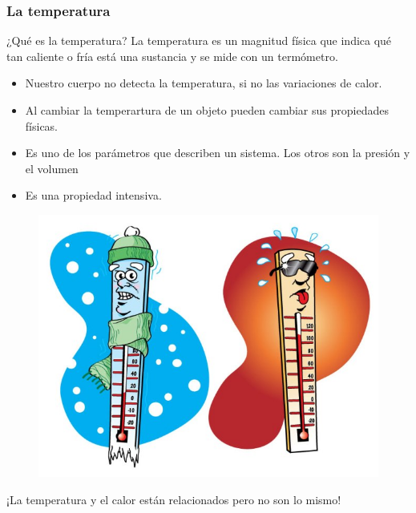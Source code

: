\documentclass[handout]{beamer}
\begin{document}
\begin{frame}
  \frametitle{La temperatura}
  \begin{block}{¿Qué es la temperatura?}
    La temperatura es un magnitud física que indica qué tan caliente o fría está una
    sustancia y se mide con un termómetro.
  \end{block}

  \begin{itemize}
  \item Nuestro cuerpo no detecta la temperatura, si no las variaciones de calor.
  \item Al cambiar la temperartura de un objeto pueden cambiar sus propiedades físicas.
  \item Es uno de los parámetros que describen un sistema. Los otros son la presión y el
    volumen
  \item Es una propiedad intensiva. 
  \end{itemize}
\end{frame}

\begin{frame}
  \begin{figure}[h]
    \centering
    \includegraphics[scale=0.3]{temperature}
  \end{figure}

  \begin{center}
    \huge
    ¡La temperatura y el calor están relacionados pero no son lo mismo!
  \end{center}
\end{frame}
\end{document}

